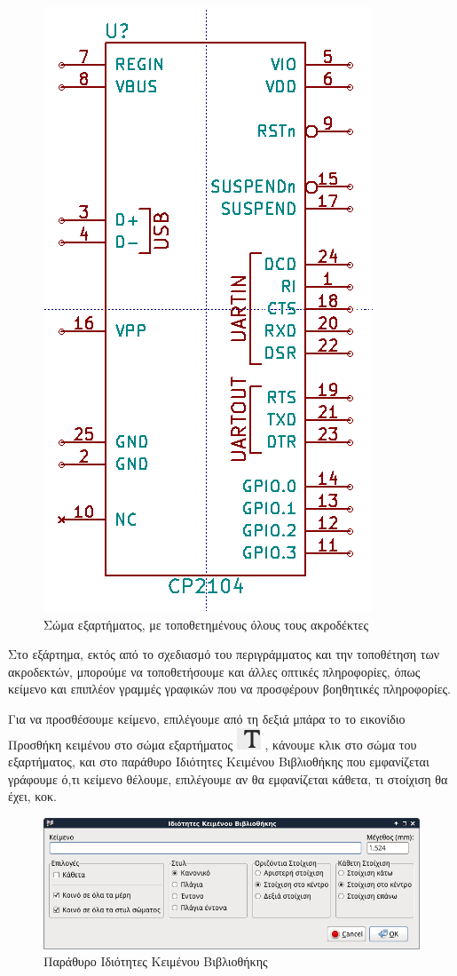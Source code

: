\documentclass[a4paper]{article}
\begin{document}
\begin{figure}
  \begin{center}
    \includegraphics[width=.35\textwidth]{img/libed-circ-allpinslaced.png}
    \caption{Σώμα εξαρτήματος, με τοποθετημένους όλους τους ακροδέκτες}
    \label{fig:libed-circ-allpinslaced}
  \end{center}
\end{figure}

Στο εξάρτημα, εκτός από το σχεδιασμό του περιγράμματος και την τοποθέτηση των ακροδεκτών, μπορούμε να τοποθετήσουμε και άλλες οπτικές πληροφορίες, όπως κείμενο και επιπλέον γραμμές γραφικών που να προσφέρουν βοηθητικές πληροφορίες.

Για να προσθέσουμε κείμενο, επιλέγουμε από τη δεξιά μπάρα το το εικονίδιο Προσθήκη κειμένου στο σώμα εξαρτήματος \includegraphics[scale=.5]{img/libed-ico-text.png}
, κάνουμε κλικ στο σώμα του εξαρτήματος, και στο παράθυρο Ιδιότητες Κειμένου Βιβλιοθήκης \label{fig:libed-dial-text} που εμφανίζεται γράφουμε ό,τι κείμενο θέλουμε, επιλέγουμε αν θα εμφανίζεται κάθετα, τι στοίχιση θα έχει, κοκ.

\begin{figure}
  \begin{center}
    \includegraphics[width=.5\textwidth]{img/libed-dial-text.png}
    \caption{Παράθυρο Ιδιότητες Κειμένου Βιβλιοθήκης}
    \label{fig:libed-dial-text}
  \end{center}
\end{figure}
\end{document}
